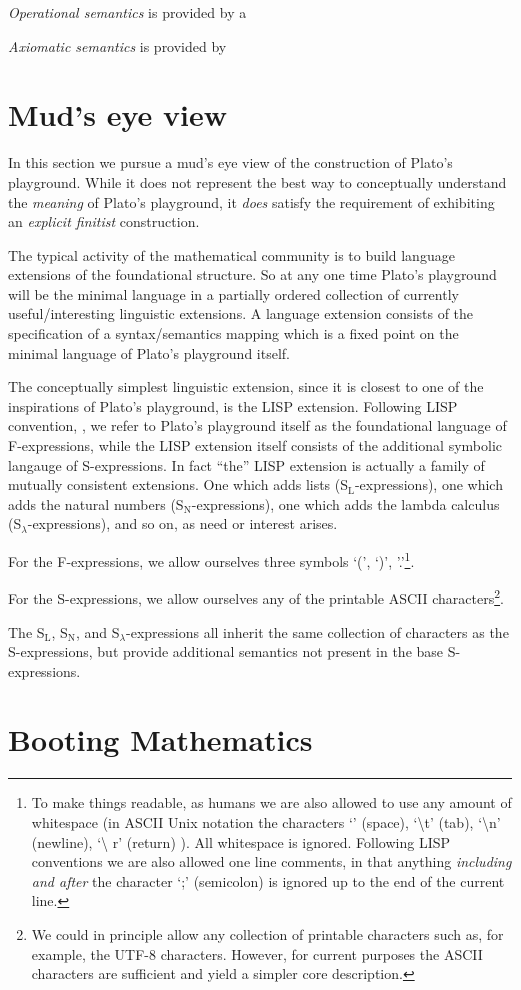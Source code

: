 \emph{Operational semantics} is provided by a 

\emph{Axiomatic semantics} is provided by

\section{Mud's eye view}

In this section we pursue a mud's eye view of the construction of Plato's
playground. While it does not represent the best way to conceptually understand
the \emph{meaning} of Plato's playground, it \emph{does} satisfy the requirement
of exhibiting an \emph{explicit finitist} construction.

The typical activity of the mathematical community is to build language
extensions of the foundational structure. So at any one time Plato's playground
will be the minimal language in a partially ordered collection of currently
useful/interesting linguistic extensions. A language extension consists of the
specification of a syntax/semantics mapping which is a fixed point on the
minimal language of Plato's playground itself.

The conceptually simplest linguistic extension, since it is closest to one of
the inspirations of Plato's playground, is the LISP extension. Following LISP
convention, \cite{mcCarthy1960lisp}, we refer to Plato's playground itself as
the foundational language of F-expressions, while the LISP extension itself
consists of the additional symbolic langauge of S-expressions. In fact ``the''
LISP extension is actually a family of mutually consistent extensions. One which
adds lists (S$_{\text{L}}$-expressions), one which adds the natural numbers
(S$_{\text{N}}$-expressions), one which adds the lambda calculus
(S$_{\lambda}$-expressions), and so on, as need or interest arises.

For the F-expressions, we allow ourselves three symbols `(', `)',
'.'\footnote{To make things readable, as humans we are also allowed to use any
amount of whitespace (in ASCII Unix notation the characters `\textvisiblespace'
(space), `\textbackslash t' (tab), `\textbackslash n' (newline), `\textbackslash
r' (return) ). All whitespace is ignored. Following LISP conventions we are also
allowed one line comments, in that anything \emph{including and after} the
character `;' (semicolon) is ignored up to the end of the current line.}.

For the S-expressions, we allow ourselves any of the printable ASCII
characters\footnote{We could in principle allow any collection of printable
characters such as, for example, the UTF-8 characters. However, for current
purposes the ASCII characters are sufficient and yield a simpler core
description.}.

The S$_{\text{L}}$, S$_{\text{N}}$, and S$_{\lambda}$-expressions all inherit
the same collection of characters as the S-expressions, but provide additional
semantics not present in the base S-expressions.

\section{Booting Mathematics}

